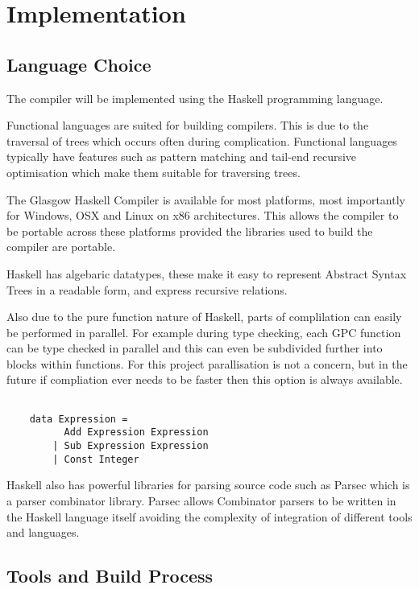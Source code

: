 \chapter{Implementation}


\section{Language Choice}

The compiler will be implemented using the Haskell programming language.

Functional languages are suited for building compilers.
This is due to the traversal of trees which occurs often during complication.
Functional languages typically have features such as pattern matching and tail-end recursive optimisation 
which make them suitable for traversing trees.

The Glasgow Haskell Compiler is available for most platforms, most importantly for Windows, OSX and Linux 
on x86 architectures. This allows the compiler to be portable across these platforms provided the libraries 
used to build the compiler are portable.

Haskell has algebaric datatypes, these make it easy to represent Abstract Syntax Trees in a 
readable form, and express recursive relations.

Also due to the pure function nature of Haskell, parts of complilation can easily be performed in parallel.
For example during type checking, each GPC function can be type checked in parallel and this can even be subdivided 
further into blocks within functions. For this project parallisation is not a concern, but in the future if compliation ever
needs to be faster then this option is always available.

\begin{lstlisting}[style=myHaskell]

    data Expression =
          Add Expression Expression
        | Sub Expression Expression
        | Const Integer

\end{lstlisting}



Haskell also has powerful libraries for parsing source code such as Parsec which is a parser combinator
library. Parsec allows Combinator parsers to be written in the Haskell language itself avoiding the complexity
of integration of different tools and languages. 
\cite{parsec}

\section{Tools and Build Process}


